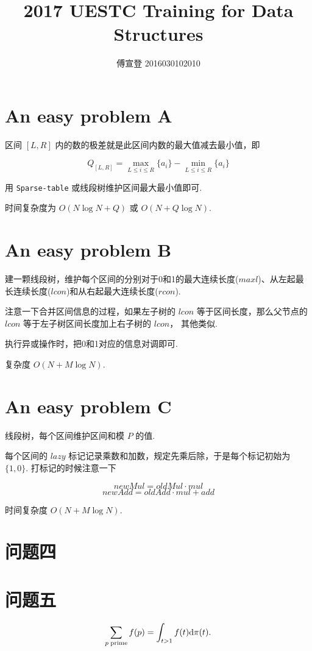 \documentclass[fontset=windowsnew,zihao=-4,scheme=chinese,punct=quanjiao,linespread=1.35,UTF8]{ctexart}
\begin{document}
\title{2017 UESTC Training for Data Structures}
\author{傅宣登 2016030102010}

\maketitle

\section{An easy problem A}

区间 $[L,R]$ 内的数的极差就是此区间内数的最大值减去最小值，即

\[
Q_{[L,R]} = \max_{L\le i \le R}{\{a_i\}} - \min_{L\le i \le R}{\{a_i\}}
\]

用 \verb|Sparse-table| 或线段树维护区间最大最小值即可.

时间复杂度为 $O(N\log{N}+Q)$ 或 $O(N+Q\log{N})$.

\section{An easy problem B}

建一颗线段树，维护每个区间的分别对于0和1的最大连续长度($maxl$)、从左起最长连续长度($lcon$)和从右起最大连续长度($rcon$).

注意一下合并区间信息的过程，如果左子树的 $lcon$ 等于区间长度，那么父节点的 $lcon$ 等于左子树区间长度加上右子树的 $lcon$，
其他类似.

执行异或操作时，把0和1对应的信息对调即可.

复杂度 $O(N+M\log{N})$.

\section{An easy problem C}

线段树，每个区间维护区间和模 $P$ 的值. 

每个区间的 $lazy$ 标记记录乘数和加数，规定先乘后除，于是每个标记初始为 $\{1,0\}$.
打标记的时候注意一下

\[
newMul = oldMul \cdot mul
\]
\[
  newAdd = oldAdd \cdot mul + add
\]

时间复杂度 $O(N+M\log{N})$.

\section{问题四}

\section{问题五}
\[
  \sum_{p\rm\;prime}f(p) = \int_{t>1}f(t)\mathrm{d}\pi(t).
\]
\end{document}
